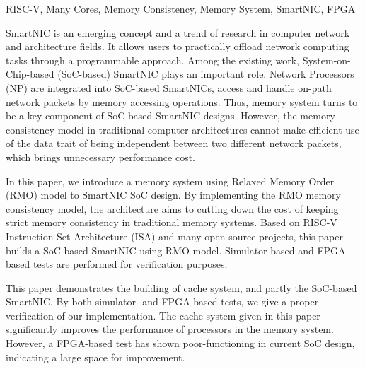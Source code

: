 \documentclass[supercite,notofont,hustthesis]{HustGraduPaper}
\begin{document}
\begin{enabstract}{RISC-V, Many Cores, Memory Consistency, Memory System, SmartNIC, FPGA}

SmartNIC is an emerging concept and a trend of research in computer network and
architecture fields. It allows users to practically offload network computing
tasks through a programmable approach. Among the existing work,
System-on-Chip-based (SoC-based) SmartNIC plays an important role. Network
Processors (NP) are integrated into SoC-based SmartNICs, access and handle
on-path network packets by memory accessing operations. Thus, memory system
turns to be a key component of SoC-based SmartNIC designs. However, the memory
consistency model in traditional computer architectures cannot make efficient
use of the data trait of being independent between two different network
packets, which brings unnecessary performance cost.

In this paper, we introduce a memory system using Relaxed Memory Order (RMO)
model to SmartNIC SoC design. By implementing the RMO memory consistency model,
the architecture aims to cutting down the cost of keeping strict memory
consistency in traditional memory systems. Based on RISC-V Instruction Set
Architecture (ISA) and many open source projects, this paper builds a SoC-based
SmartNIC using RMO model. Simulator-based and FPGA-based tests are performed for
verification purposes.

This paper demonstrates the building of cache system, and partly the SoC-based
SmartNIC. By both simulator- and FPGA-based tests, we give a proper verification
of our implementation. The cache system given in this paper significantly
improves the performance of processors in the memory system. However, a
FPGA-based test has shown poor-functioning in current SoC design, indicating a
large space for improvement.

\end{enabstract}

\tableofcontents[level=2]

\clearpage








\end{document}
